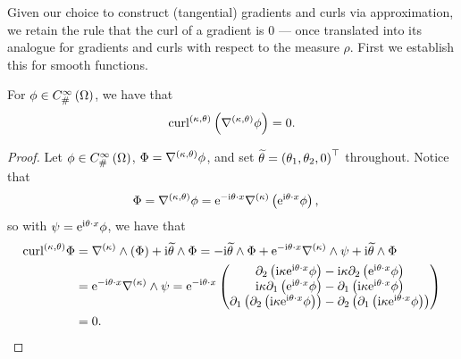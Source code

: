 Given our choice to construct (tangential) gradients and curls via approximation, we retain the rule that the curl of a gradient is 0 --- once translated into its analogue for gradients and curls with respect to the measure $\rho$.
First we establish this for smooth functions.
\begin{lemma} \label{lem:CurlOfGradSmoothFunctions}
	For $\phi\in C^{\infty}_{\#}\left( \Omega \right)$, we have that
	\begin{align*}
		\mathrm{curl}_{}^{\left( \kappa, \theta \right)}\left( \nabla^{\left( \kappa, \theta \right)}\phi \right) = 0.
	\end{align*}
\end{lemma}
\begin{proof}
	Let $\phi\in C^{\infty}_{\#}\left( \Omega \right)$, $\Phi = \nabla^{\left( \kappa, \theta \right)}\phi$, and set $\widetilde{\theta} = \left( \theta_1, \theta_2, 0 \right)^\top$ throughout.
	Notice that
	\begin{align*}
		\Phi = \nabla^{\left( \kappa, \theta \right)}\phi &= \mathrm{e}^{-\mathrm{i}\theta\cdot x}\nabla^{(\kappa)}\left(  \mathrm{e}^{\mathrm{i}\theta\cdot x}\phi  \right),
	\end{align*}
	so with $\psi = \mathrm{e}^{\mathrm{i}\theta\cdot x}\phi$, we have that
	\begin{align*}
		\mathrm{curl}_{}^{\left( \kappa, \theta \right)}\Phi 
		&= \nabla^{(\kappa)}\wedge\left(  \Phi  \right) + \mathrm{i}\widetilde{\theta}\wedge\Phi
		= -\mathrm{i}\widetilde{\theta}\wedge\Phi + \mathrm{e}^{-\mathrm{i}\theta\cdot x}\nabla^{(\kappa)}\wedge\psi + \mathrm{i}\widetilde{\theta}\wedge\Phi \\
		&= \mathrm{e}^{-\mathrm{i}\theta\cdot x}\nabla^{(\kappa)}\wedge\psi
		= \mathrm{e}^{-\mathrm{i}\theta\cdot x} 
		\begin{pmatrix}
			\partial_2\left(  \mathrm{i}\kappa \mathrm{e}^{\mathrm{i}\theta\cdot x}\phi  \right) - \mathrm{i}\kappa\partial_2\left(  \mathrm{e}^{\mathrm{i}\theta\cdot x}\phi  \right) \\
			\mathrm{i}\kappa\partial_1\left(  \mathrm{e}^{\mathrm{i}\theta\cdot x}\phi  \right) - \partial_1\left(  \mathrm{i}\kappa \mathrm{e}^{\mathrm{i}\theta\cdot x}\phi  \right) \\
			\partial_1\left(  \partial_2\left( \mathrm{i}\kappa\mathrm{e}^{\mathrm{i}\theta\cdot x}\phi \right)  \right) - \partial_2\left(  \partial_1\left( \mathrm{i}\kappa\mathrm{e}^{\mathrm{i}\theta\cdot x}\phi \right)  \right)
		\end{pmatrix} \\
		&= 0.
	\end{align*}
\end{proof}

